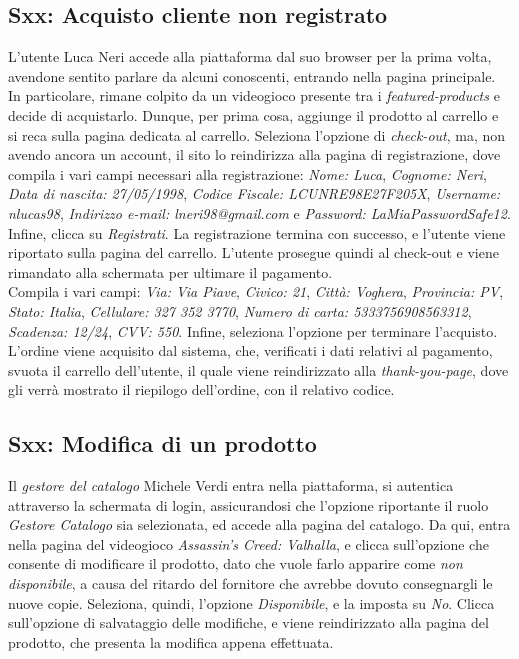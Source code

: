 \documentclass[12pt, a4paper, oneside]{book}
\begin{document}
    \subsection*{Sxx: Acquisto cliente non registrato}
         L'utente Luca Neri accede alla piattaforma dal suo browser per la prima volta, avendone sentito parlare da alcuni conoscenti, entrando nella pagina principale.
         In particolare, rimane colpito da un videogioco presente tra i \textit{featured-products} e decide di acquistarlo. Dunque, per prima cosa, aggiunge il prodotto
         al carrello e si reca sulla pagina dedicata al carrello. Seleziona l'opzione di \textit{check-out}, ma, non avendo ancora un account, il sito lo reindirizza alla pagina
         di registrazione, dove compila i vari campi necessari alla registrazione: \textit{Nome: Luca}, \textit{Cognome: Neri}, \textit{Data di nascita: 27/05/1998},
         \textit{Codice Fiscale: LCUNRE98E27F205X}, \textit{Username: nlucas98}, \textit{Indirizzo e-mail: lneri98@gmail.com} e \textit{Password: LaMiaPasswordSafe12}. Infine, clicca
         su \textit{Registrati}. La registrazione termina con successo, e l'utente viene riportato sulla pagina del carrello. L'utente prosegue quindi al check-out e viene rimandato
         alla schermata per ultimare il pagamento.\\
         Compila i vari campi: \textit{Via: Via Piave}, \textit{Civico: 21}, \textit{Città: Voghera}, \textit{Provincia: PV}, \textit{Stato: Italia}, \textit{Cellulare: 327 352 3770},
         \textit{Numero di carta: 5333756908563312}, \textit{Scadenza: 12/24}, \textit{CVV: 550}. Infine, seleziona l'opzione per terminare l'acquisto.\\
         L'ordine viene acquisito dal sistema, che, verificati i dati relativi al pagamento, svuota il carrello dell'utente, il quale viene reindirizzato alla \textit{thank-you-page},
         dove gli verrà mostrato il riepilogo dell'ordine, con il relativo codice.

    \subsection*{Sxx: Modifica di un prodotto}
        Il \textit{gestore del catalogo} Michele Verdi entra nella piattaforma, si autentica attraverso la schermata di login, assicurandosi
        che l'opzione riportante il ruolo \textit{Gestore Catalogo} sia selezionata, ed accede alla pagina del catalogo. Da qui, entra
        nella pagina del videogioco \textit{Assassin's Creed: Valhalla}, e clicca sull'opzione che consente di modificare il prodotto, dato che vuole farlo apparire
        come \textit{non disponibile}, a causa del ritardo del fornitore che avrebbe dovuto consegnargli le nuove copie. Seleziona, quindi, l'opzione \textit{Disponibile},
        e la imposta su \textit{No}. Clicca sull'opzione di salvataggio delle modifiche, e viene reindirizzato alla pagina del prodotto, che presenta la modifica appena effettuata.
\end{document}
